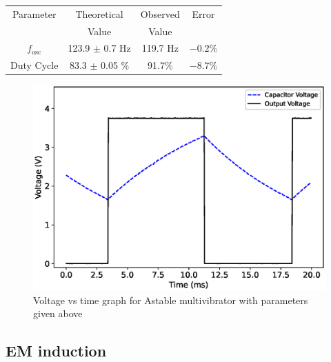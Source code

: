 \begin{table}[H]
    \centering
    \begin{tabular}{|c|c|c|c|}\hline
        Parameter & Theoretical & Observed & Error \\ 
        & Value       & Value    &       \\ \hline 
        $f_\text{osc}$   & 123.9 $\pm$ 0.7 Hz & 119.7 Hz & $-0.2\%$  \\ \hline
        Duty Cycle       & 83.3 $\pm$ 0.05 \% & 91.7\%  & $-8.7\%$ \\ \hline
    \end{tabular}
\end{table}
\begin{figure}[H]
    \centering
    \includegraphics[width=1\columnwidth]{images/5553.eps}
    \caption{Voltage vs time graph for Astable multivibrator with parameters given above}
\end{figure}
    
\subsection{EM induction}
    
